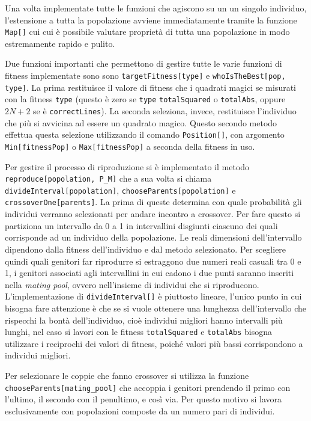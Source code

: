 \documentclass[italian,twoside,twocolumn]{article}
\begin{document}
Una volta implementate tutte le funzioni che agiscono su un un singolo individuo, l'estensione a tutta la popolazione avviene immediatamente tramite la funzione \texttt{Map[]} cui cui è possibile valutare proprietà di tutta una popolazione in modo estremamente rapido e pulito. 

Due funzioni importanti che permettono di gestire tutte le varie funzioni di fitness implementate sono sono \texttt{targetFitness[type]} e \texttt{whoIsTheBest[pop, type]}. La prima restituisce il valore di fitness che i quadrati magici se misurati con la fitness \texttt{type} (questo è zero se \texttt{type} \texttt{totalSquared} o \texttt{totalAbs}, oppure $ 2 N + 2 $ se è  \texttt{correctLines}). La seconda seleziona, invece, restituisce l'individuo che più si avvicina ad essere un quadrato magico. Questo secondo metodo effettua questa selezione utilizzando il comando \texttt{Position[]}, con argomento \texttt{Min[fitnessPop]} o \texttt{Max[fitnessPop]} a seconda della fitness in uso.

Per gestire il processo di riproduzione si è implementato il metodo \texttt{reproduce[popolation, P\_M]} che a sua volta si chiama \texttt{divideInterval[popolation]}, \texttt{chooseParents[popolation]} e \texttt{crossoverOne[parents]}. La prima di queste determina con quale probabilità gli individui verranno selezionati per andare incontro a crossover. Per fare questo si partiziona un intervallo da 0 a 1 in intervallini disgiunti ciascuno dei quali corrisponde ad un individuo della popolazione. Le reali dimensioni dell'intervallo dipendono dalla fitness dell'individuo e dal metodo selezionato. Per scegliere quindi quali genitori far riprodurre si estraggono due numeri reali casuali tra 0 e 1, i genitori associati agli intervallini in cui cadono i due punti saranno inseriti nella \emph{mating pool}, ovvero nell'insieme di individui che si riproducono. L'implementazione di \texttt{divideInterval[]} è piuttosto lineare, l'unico punto in cui bisogna fare attenzione è che se si vuole ottenere una lunghezza dell'intervallo che rispecchi la bontà dell'individuo, cioè individui migliori hanno intervalli più lunghi, nel caso si lavori con le fitness \texttt{totalSquared} e \texttt{totalAbs} bisogna utilizzare i reciprochi dei valori di fitness, poiché valori più bassi corrispondono a individui migliori.

Per selezionare le coppie che fanno crossover si utilizza la funzione \texttt{chooseParents[mating\_pool]} che accoppia i genitori prendendo il primo con l'ultimo, il secondo con il penultimo, e così via. Per questo motivo si lavora esclusivamente con popolazioni composte da un numero pari di individui.
\end{document}
